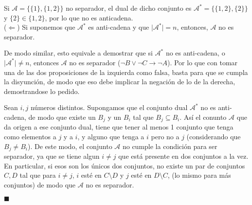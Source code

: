 \documentclass[letter]{article}
\begin{document}
\begin{pregunta}{2}
\begin{enumerate}
			Si $\mathcal{A}=\{\{1\}, \{1,2\}\}$ no separador, el dual de dicho conjunto es $\mathcal{A}^*=\{\{1,2\}, \{2\}\}$ y $\{2\} \in \{1,2\}$, por lo que no es anticadena.\\
			
			($\Leftarrow$) Si suponemos que $\mathcal{A}^*$ es anti-cadena y que $\vert\mathcal{A}^*\vert=n$, entonces, $\mathcal{A}$ no es separador.
			
			De modo similar, esto equivale a demostrar que si $\mathcal{A}^*$ no es anti-cadena, o $\vert\mathcal{A}^*\vert\neq n$, entonces $\mathcal{A}$ no es separador ($\neg B \vee \neg C \rightarrow \neg A$). Por lo que con tomar una de las dos proposiciones de la izquierda como falsa, basta para que se cumpla la disyunción, de modo que eso debe implicar la negación de lo de la derecha, demostrandose lo pedido.
			
			Sean $i, j$ números distintos. Supongamos que el conjunto dual $\mathcal{A}^*$ no es anti-cadena, de modo que existe un $B_j$ y un $B_i$ tal que $B_j \subseteq B_i$. Así el conunto $\mathcal{A}$ que da origen a ese conjunto dual, tiene que tener al menos 1 conjunto que tenga como elementos a $j$ y a $i$, y alguno que tenga a $i$ pero no a $j$ (considerando que $B_j \neq B_i$). De este modo, el conjunto $\mathcal{A}$ no cumple la condición para ser separador, ya que se tiene algun $i\neq j$ que está presente en dos conjuntos a la vez. En particular, si esos son los únicos dos conjuntos, no existe un par de conjuntos $C, D$ tal que para $i\neq j$, $i$ esté en $C\setminus D$ y $j$ esté en $D\setminus C$, (lo mismo para más conjuntos) de modo que $\mathcal{A}$ no es separador.
			
			\flushright$\blacksquare$
			
		\end{enumerate}
		
	\end{pregunta}
\end{document}
